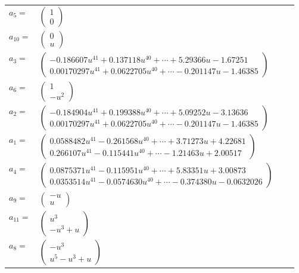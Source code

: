 \documentclass[1p]{elsarticle_modified}
\theoremstyle{definition}
\begin{document}
\begin{tabular}{m{7pt} m{180pt} m{7pt} m{180pt} }
\flushright $a_{5}=$&$\begin{pmatrix}1\\0\end{pmatrix}$ \\
\flushright $a_{10}=$&$\begin{pmatrix}0\\u\end{pmatrix}$ \\
\flushright $a_{3}=$&$\begin{pmatrix}-0.186607 u^{41}+0.137118 u^{40}+\cdots+5.29366 u-1.67251\\0.00170297 u^{41}+0.0622705 u^{40}+\cdots-0.201147 u-1.46385\end{pmatrix}$ \\
\flushright $a_{6}=$&$\begin{pmatrix}1\\- u^2\end{pmatrix}$ \\
\flushright $a_{2}=$&$\begin{pmatrix}-0.184904 u^{41}+0.199388 u^{40}+\cdots+5.09252 u-3.13636\\0.00170297 u^{41}+0.0622705 u^{40}+\cdots-0.201147 u-1.46385\end{pmatrix}$ \\
\flushright $a_{1}=$&$\begin{pmatrix}0.0588482 u^{41}-0.261568 u^{40}+\cdots+3.71273 u+4.22681\\0.266107 u^{41}-0.115441 u^{40}+\cdots-1.21463 u+2.00517\end{pmatrix}$ \\
\flushright $a_{4}=$&$\begin{pmatrix}0.0875371 u^{41}-0.115951 u^{40}+\cdots+5.83351 u+3.00873\\0.0353514 u^{41}-0.0574630 u^{40}+\cdots-0.374380 u-0.0632026\end{pmatrix}$ \\
\flushright $a_{9}=$&$\begin{pmatrix}- u\\u\end{pmatrix}$ \\
\flushright $a_{11}=$&$\begin{pmatrix}u^3\\- u^3+u\end{pmatrix}$ \\
\flushright $a_{8}=$&$\begin{pmatrix}- u^3\\u^5- u^3+u\end{pmatrix}$ \\

\end{tabular}
\end{document}
